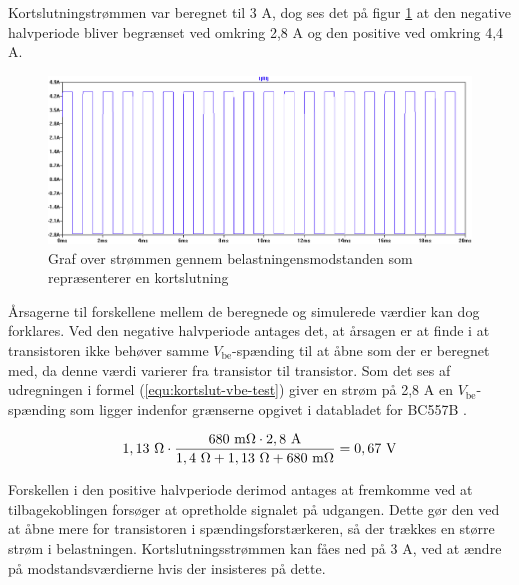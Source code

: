Kortslutningstrømmen var beregnet til 3 A, dog ses det på figur \ref{fig:kortslut-graf} at den negative halvperiode bliver begrænset ved omkring 2,8 A og den positive ved omkring 4,4 A.

\begin{figure}[h]
\centering
\includegraphics[width=\textwidth]{teknisk/effektforstaerker/kortslut-graf.png}
\caption{Graf over strømmen gennem belastningensmodstanden som repræsenterer en kortslutning}
\label{fig:kortslut-graf}
\end{figure}

Årsagerne til forskellene mellem de beregnede og simulerede værdier kan dog forklares. Ved den negative halvperiode antages det, at årsagen er at finde i at transistoren ikke behøver samme $V_\mathrm{be}$-spænding til at åbne som der er beregnet med, da denne værdi varierer fra transistor til transistor. Som det ses af udregningen i formel (\ref{equ:kortslut-vbe-test}) giver en strøm på 2,8 A en $V_\mathrm{be}$-spænding som ligger indenfor grænserne opgivet i databladet for BC557B \cite{bc557b-datablad}.%

\begin{equation}
\label{equ:kortslut-vbe-test}
1,13~\ohm \cdot \frac{\mathrm{680~m\ohm} \cdot \mathrm{2,8~A}}{1,4~\ohm + 1,13~\ohm + \mathrm{680~m\ohm}} = \mathrm{0,67~V}
\end{equation}

Forskellen i den positive halvperiode derimod antages at fremkomme ved at tilbagekoblingen forsøger at opretholde signalet på udgangen. Dette gør den ved at åbne mere for transistoren i spændingsforstærkeren, så der trækkes en større strøm i belastningen. Kortslutningsstrømmen kan fåes ned på 3 A, ved at ændre på modstandsværdierne hvis der insisteres på dette. 